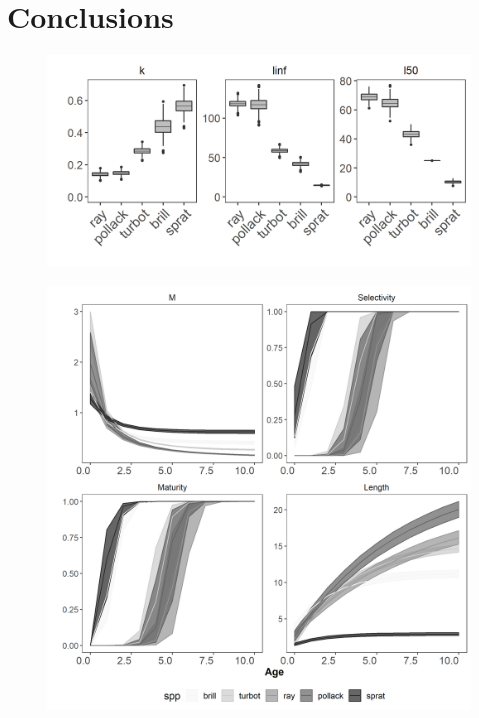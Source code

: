 \documentclass[preprint,review,12pt]{elsarticle}
\begin{document}


\section{Conclusions}




 




\begin{figure}[]\centering\includegraphics[width=5in]{fig1.png}\caption{}\label{fig:fig1}\end{figure}
\begin{figure}[]\centering\includegraphics[width=5in]{fig2.png}\caption{}\label{fig:fig2}\end{figure}
\end{document}
